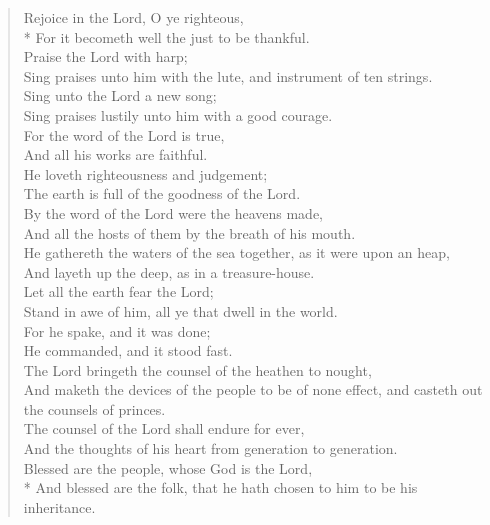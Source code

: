 \documentclass[MAIN]{subfiles}
\begin{document}
\begin{verse}
Rejoice in the Lord, O ye righteous,\\*
\vin For it becometh well the just to be thankful.\\
Praise the Lord with harp;\\
\vin Sing praises unto him with the lute, and instrument of ten strings.\\
Sing unto the Lord a new song;\\
\vin Sing praises lustily unto him with a good courage.\\
For the word of the Lord is true,\\
\vin And all his works are faithful.\\
He loveth righteousness and judgement;\\
\vin The earth is full of the goodness of the Lord.\\
By the word of the Lord were the heavens made,\\
\vin And all the hosts of them by the breath of his mouth.\\
He gathereth the waters of the sea together, as it were upon an heap,\\
\vin And layeth up the deep, as in a treasure-house.\\
Let all the earth fear the Lord;\\
\vin Stand in awe of him, all ye that dwell in the world.\\
For he spake, and it was done;\\
\vin He commanded, and it stood fast.\\
The Lord bringeth the counsel of the heathen to nought,\\
\vin And maketh the devices of the people to be of none effect, and casteth out the counsels of princes.\\
The counsel of the Lord shall endure for ever,\\
\vin And the thoughts of his heart from generation to generation.\\
Blessed are the people, whose God is the Lord,\\*
\vin And blessed are the folk, that he hath chosen to him to be his inheritance.
\end{verse}
\end{document}
